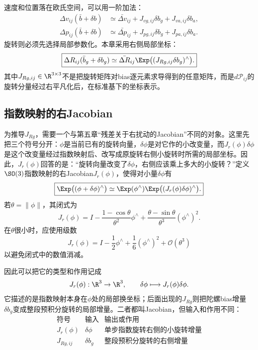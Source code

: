 速度和位置落在欧氏空间，可以用一阶加法：
\[
\begin{aligned}
    \Delta v_{ij}(\bar b+\delta b)
    &\simeq
    \bar{\Delta v}_{ij}
    +J_{v g,ij}\delta b_g
    +J_{v a,ij}\delta b_a,\\
    \Delta p_{ij}(\bar b+\delta b)
    &\simeq
    \bar{\Delta p}_{ij}
    +J_{p g,ij}\delta b_g
    +J_{p a,ij}\delta b_a.
\end{aligned}
\]
旋转则必须先选择局部参数化。本章采用右侧局部坐标：
\[
\boxed{
    \Delta R_{ij}(\bar b_g+\delta b_g)
    \simeq
    \bar{\Delta R}_{ij}
    \Exp\bigl((J_{R g,ij}\delta b_g)^\wedge\bigr).
}
\]
其中$J_{R g,ij}\in\R^{3\times3}$不是把旋转矩阵对bias逐元素求导得到的任意矩阵，而是$d\mathcal P_{ij}$的旋转分量经过右平凡化后，在标准基下的坐标表示。

\subsection{指数映射的右Jacobian}

为推导$J_{R g}$，需要一个与第五章“残差关于右扰动的Jacobian”不同的对象。这里先把三个符号分开：$\phi$是当前已有的旋转向量，$\delta\phi$是对它作的小改变量，而$J_r(\phi)\delta\phi$是这个改变量经过指数映射后、改写成原旋转右侧小旋转时所需的局部坐标。因此，$J_r(\phi)$回答的是：“旋转向量改变了$\delta\phi$，右侧应该乘上多大的小旋转？”定义$\SO(3)$指数映射的右Jacobian$J_r(\phi)$，使得对小量$\delta\phi$有
\[
\boxed{
    \Exp\bigl((\phi+\delta\phi)^\wedge\bigr)
    \simeq
    \Exp(\phi^\wedge)
    \Exp\bigl((J_r(\phi)\delta\phi)^\wedge\bigr).
}
\]
若$\theta=\|\phi\|$，其闭式为
\[
    J_r(\phi)
    =I-\frac{1-\cos\theta}{\theta^2}\phi^\wedge
      +\frac{\theta-\sin\theta}{\theta^3}(\phi^\wedge)^2.
\]
在$\theta$很小时，应使用级数
\[
    J_r(\phi)
    =I-\frac12\phi^\wedge
      +\frac16(\phi^\wedge)^2+\mathcal O(\theta^3)
\]
以避免闭式中的数值消减。

因此可以把它的类型和作用记成
\[
    J_r(\phi):\R^3\to\R^3,
    \qquad
    \delta\phi\longmapsto J_r(\phi)\delta\phi.
\]
它描述的是指数映射本身在$\phi$处的局部换坐标；后面出现的$J_{R g}$则把陀螺bias增量$\delta b_g$变成整段预积分旋转的局部增量。二者都叫Jacobian，但输入和作用不同：
\[
\begin{array}{c|c|c}
\text{符号} & \text{输入} & \text{输出或作用}\\ \hline
J_r(\phi) & \delta\phi & \text{单步指数旋转右侧的小旋转增量}\\
J_{R g,ij} & \delta b_g & \text{整段预积分旋转的右侧增量}
\end{array}
\]


